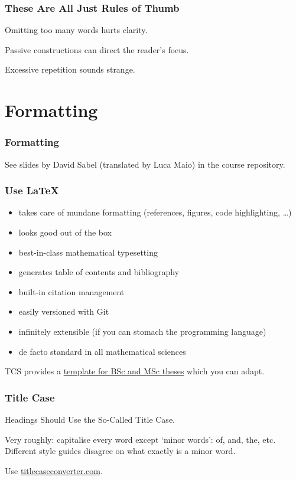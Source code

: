 \documentclass[xetex]{beamer}
\begin{document}
\begin{frame}
  \frametitle{These Are All Just Rules of Thumb}

  Omitting too many words hurts clarity.

  \medskip
  \pause

  Passive constructions can direct the reader's focus.

  \medskip
  \pause

  Excessive repetition sounds strange.
\end{frame}

\section{Formatting}

\begin{frame}
  \frametitle{Formatting}

  See slides by David Sabel (translated by Luca Maio) in the course repository.
\end{frame}

\begin{frame}
  \frametitle{Use \LaTeX}

  \begin{itemize}[<+->]
    \item takes care of mundane formatting (references, figures, code highlighting, \dots)
    \item looks good out of the box
    \item best-in-class mathematical typesetting
    \item generates table of contents and bibliography
    \item built-in citation management
    \item easily versioned with Git
    \item infinitely extensible (if you can stomach the programming language)
    \item de facto standard in all mathematical sciences
  \end{itemize}

  \medskip
  \pause

  TCS provides a \href{https://www.tcs.ifi.lmu.de/lehre/bsc-master-arbeiten_de.html}{template for BSc and MSc theses} which you can adapt.
\end{frame}

\begin{frame}
  \frametitle{Title Case}

  Headings Should Use the So-Called Title Case.

  \medskip

  Very roughly: capitalise every word except \enquote*{minor words}: of, and, the, etc.
  Different style guides disagree on what exactly is a minor word.

  \medskip
  \pause

  Use \url{titlecaseconverter.com}.
\end{frame}
\end{document}
